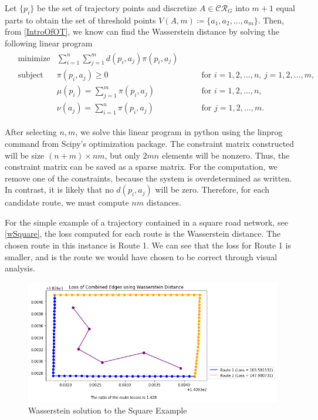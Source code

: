 \documentclass{article}
\numberwithin{equation}{section}
\theoremstyle{definition}
\newcommand{\CR}{\mathcal{CR}}
\def\:={\coloneqq} %
\begin{document}
Let $\{p_{i}\}$ be the set of trajectory points and discretize $A\in\CR_G$ into $m+1$ equal parts to obtain the set of  threshold points $V(A,m)\:=\{a_1,a_2,\ldots,a_m\}$. Then, from \autoref{IntroOfOT}, we know can find the Wasserstein distance by solving the following linear program
\begin{align}
\begin{aligned}
    & \text{minimize} 
        & \sum_{i=1}^n \sum_{j=1}^m d(p_i,a_j)\pi(p_i,a_j) & & \label{object func.1} \\
    & \text{subject to} 
        & \pi(p_i,a_j)\ge 0 & \qquad \text{for } i=1,2,\ldots,n,\, j=1,2,\ldots,m, \\
        & & \mu(p_i)=\sum_{j=1}^m \pi(p_i,a_j) & \qquad \text{for } i=1,2,\ldots,n, \\
        & & \nu(a_j)=\sum_{i=1}^n \pi(p_i,a_j) & \qquad \text{for } j=1,2,\ldots,m. 
\end{aligned}
\end{align}


After selecting $n,m$, we solve this linear program in python using the linprog command from Scipy's optimization package. The constraint matrix constructed will be size $(n+m) \times nm$, but only $2mn$ elements will be nonzero. Thus, the constraint matrix can be saved as a sparse matrix. For the computation, we remove one of the constraints, because the system is overdetermined as written. In contrast, it is likely that no  $d(p_i,a_j)$ will be zero. Therefore, for each candidate route, we must compute $nm$ distances. 


For the simple example of a trajectory contained in a square road network, see \autoref{wSquare}, the loss computed for each route is the Wasserstein distance. The chosen route in this instance is Route 1. We can see that the loss for Route 1 is smaller, and is the route we would have chosen to be correct through visual analysis. 
\begin{figure}[h!]
    \raggedleft
    \includegraphics[scale=.5]{Wass.png}
    \caption{Wasserstein solution to the Square Example}
    \label{wSquare}
\end{figure}
\end{document}
